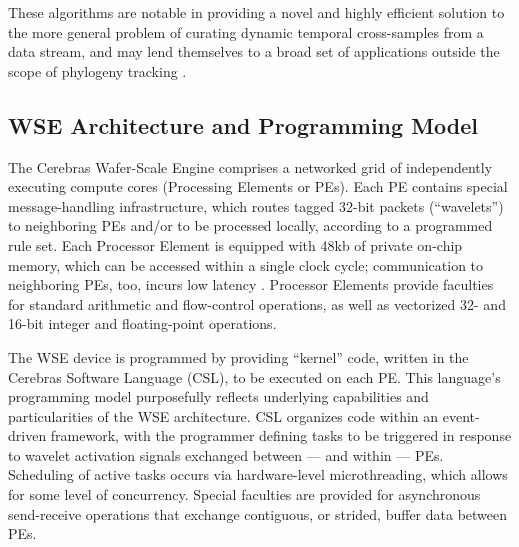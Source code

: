 These algorithms are notable in providing a novel and highly efficient solution to the more general problem of curating dynamic temporal cross-samples from a data stream, and may lend themselves to a broad set of applications outside the scope of phylogeny tracking \citep{moreno2024algorithms}.




\subsection{WSE Architecture and Programming Model}

The Cerebras Wafer-Scale Engine comprises a networked grid of independently executing compute cores (Processing Elements or PEs).
Each PE contains special message-handling infrastructure, which routes tagged 32-bit packets (``wavelets'') to neighboring PEs and/or to be processed locally, according to a programmed rule set.
Each Processor Element is equipped with 48kb of private on-chip memory, which can be accessed within a single clock cycle;
communication to neighboring PEs, too, incurs low latency \citep{buitrago2021neocortex}.
Processor Elements provide faculties for standard arithmetic and flow-control operations, as well as vectorized 32- and 16-bit integer and floating-point operations.

The WSE device is programmed by providing ``kernel'' code, written in the Cerebras Software Language (CSL), to be executed on each PE.
This language's programming model purposefully reflects underlying capabilities and particularities of the WSE architecture.
CSL organizes code within an event-driven framework, with the programmer defining tasks to be triggered in response to wavelet activation signals exchanged between --- and within --- PEs.
Scheduling of active tasks occurs via hardware-level microthreading, which allows for some level of concurrency.
Special faculties are provided for asynchronous send-receive operations that exchange contiguous, or strided, buffer data between PEs.

